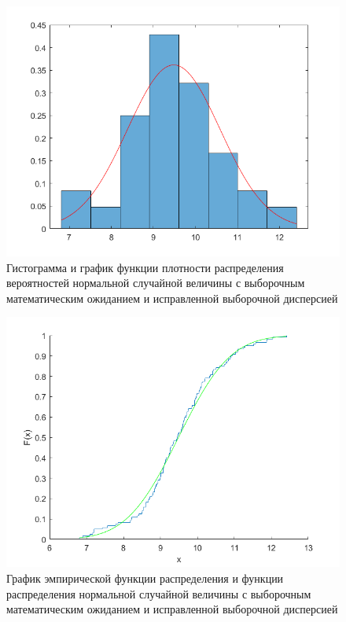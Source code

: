 \documentclass[12pt]{report}
\begin{document}
\begin{figure}[H]
	\centering
	\includegraphics[scale=0.7]{imgs/hist_dens.png}
	\caption{Гистограмма и график функции плотности распределения вероятностей нормальной случайной величины с выборочным математическим ожиданием и исправленной выборочной  дисперсией}
	\label{fig:1}
\end{figure}

\begin{figure}[H]
	\centering
	\includegraphics[scale=0.7]{imgs/func.png}
	\caption{График эмпирической функции распределения и функции распределения нормальной случайной величины с выборочным математическим ожиданием и исправленной выборочной  дисперсией}
	\label{fig:2}
\end{figure}
\end{document}
